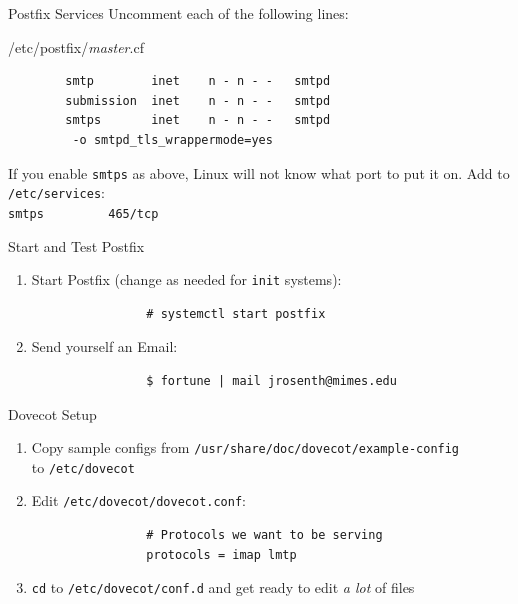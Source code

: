 \documentclass{lug}
\begin{document}
\begin{frame}[fragile]{Postfix Services}
    Uncomment each of the following lines:

    \begin{block}{\ttfamily /etc/postfix/\emph{master}.cf}
    \begin{verbatim}
        smtp        inet    n - n - -   smtpd
        submission  inet    n - n - -   smtpd
        smtps       inet    n - n - -   smtpd
         -o smtpd_tls_wrappermode=yes
    \end{verbatim}
    \end{block}

    \pause
    \bigskip

    If you enable \texttt{smtps} as above, Linux will not know what port to
    put it on. Add to \texttt{/etc/services}: \\
    \verb|smtps         465/tcp|
\end{frame}

\begin{frame}[fragile]{Start and Test Postfix}
    \begin{enumerate}
        \item Start Postfix (change as needed for \texttt{init} systems):
            \begin{verbatim}
                # systemctl start postfix
            \end{verbatim}
        \item Send yourself an Email:
            \begin{verbatim}
                $ fortune | mail jrosenth@mimes.edu
            \end{verbatim}
    \end{enumerate}
\end{frame}

\begin{frame}[fragile]{Dovecot Setup}
    \begin{enumerate}[<+->]
        \item Copy sample configs from
            \texttt{/usr/share/doc/dovecot/example-config} \\
            to \texttt{/etc/dovecot}

        \item Edit \texttt{/etc/dovecot/dovecot.conf}:
            \begin{verbatim}
                # Protocols we want to be serving
                protocols = imap lmtp
            \end{verbatim}

        \item \texttt{cd} to \texttt{/etc/dovecot/conf.d} and get ready to edit
            \emph{a lot} of files
    \end{enumerate}
\end{frame}
\end{document}
